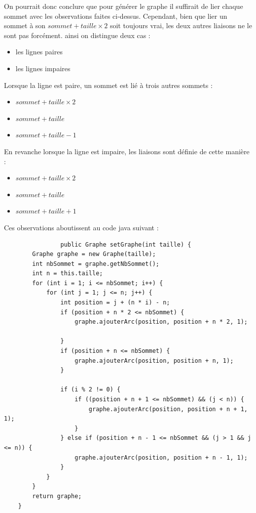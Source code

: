 \documentclass{report}
\begin{document}
			On pourrait donc conclure que pour générer le graphe il suffirait de lier chaque sommet avec les observations faites ci-dessus. Cependant, bien que lier un sommet à son $sommet+taille\times2$ soit toujours vrai, les deux autres liaisons ne le sont pas forcément. ainsi on distingue deux cas :
			
			
			\begin{itemize}
			
			
				\item les lignes paires
				\item les lignes impaires
				\end{itemize}
				
			Lorsque la ligne est paire, un sommet est lié à trois autres sommets :
				
				\begin{itemize}
					\item $sommet+taille\times2$
					\item $sommet+taille$
					\item $sommet+taille-1$
				\end{itemize}
				
			En revanche lorsque la ligne est impaire, les liaisons sont définie de cette manière : 
				
				\begin{itemize}
					\item $sommet+taille\times2$
					\item $sommet+taille$
					\item $sommet+taille+1$
					\end{itemize}
					
			Ces observations aboutissent au code java suivant : 
			\\
			\begin{verbatim}
				public Graphe setGraphe(int taille) {
        Graphe graphe = new Graphe(taille);
        int nbSommet = graphe.getNbSommet();
        int n = this.taille;
        for (int i = 1; i <= nbSommet; i++) { 
            for (int j = 1; j <= n; j++) { 
                int position = j + (n * i) - n;
                if (position + n * 2 <= nbSommet) { 
                    graphe.ajouterArc(position, position + n * 2, 1);

                }
                if (position + n <= nbSommet) {
                    graphe.ajouterArc(position, position + n, 1);
                }

                if (i % 2 != 0) {    
                    if ((position + n + 1 <= nbSommet) && (j < n)) { 
                        graphe.ajouterArc(position, position + n + 1, 1);
                    }
                } else if (position + n - 1 <= nbSommet && (j > 1 && j <= n)) {
                    graphe.ajouterArc(position, position + n - 1, 1);
                }
            }
        }
        return graphe;
    }
			\end{verbatim}
			
\end{document}
